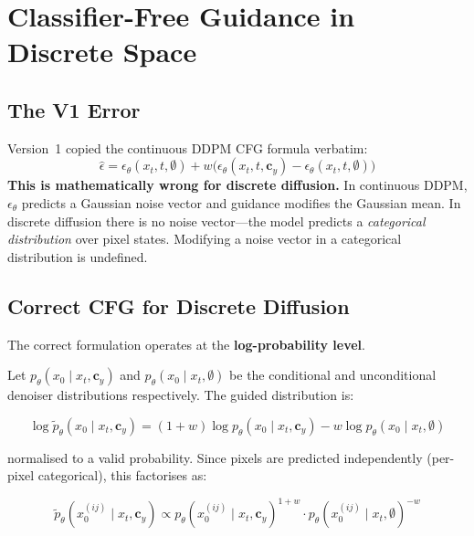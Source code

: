 \documentclass[12pt,a4paper]{article}
\newcommand{\cy}{\mathbf{c}_y}
\newcommand{\WARN}[1]{\begin{tcolorbox}[warnbox, title=V1 Error — Corrected in V2]#1\end{tcolorbox}}
\theoremstyle{definition}
\theoremstyle{plain}
\theoremstyle{remark}
\begin{document}
\section{Classifier-Free Guidance in Discrete Space}
\label{sec:cfg}

\subsection{The V1 Error}

\WARN{
Version~1 copied the continuous DDPM CFG formula verbatim:
\[
  \hat{\epsilon} = \epsilon_\theta(x_t, t, \emptyset)
    + w\bigl(\epsilon_\theta(x_t, t, \cy) - \epsilon_\theta(x_t, t, \emptyset)\bigr)
\]
\textbf{This is mathematically wrong for discrete diffusion.}
In continuous DDPM, $\epsilon_\theta$ predicts a Gaussian noise vector and guidance
modifies the Gaussian mean.
In discrete diffusion there is no noise vector—the model predicts a
\emph{categorical distribution} over pixel states.
Modifying a noise vector in a categorical distribution is undefined.
}

\subsection{Correct CFG for Discrete Diffusion}

The correct formulation operates at the \textbf{log-probability level}.

Let $p_\theta(x_0 \mid x_t, \cy)$ and $p_\theta(x_0 \mid x_t, \emptyset)$ be the
conditional and unconditional denoiser distributions respectively.
The guided distribution is:

\begin{equation}
  \log \tilde{p}_\theta(x_0 \mid x_t, \cy)
  = (1 + w)\log p_\theta(x_0 \mid x_t, \cy)
  - w\log p_\theta(x_0 \mid x_t, \emptyset)
  \label{eq:disc_cfg}
\end{equation}

normalised to a valid probability.
Since pixels are predicted independently (per-pixel categorical), this factorises as:

\begin{equation}
  \tilde{p}_\theta(x_0^{(ij)} \mid x_t, \cy)
  \propto
  p_\theta(x_0^{(ij)} \mid x_t, \cy)^{1+w}
  \cdot
  p_\theta(x_0^{(ij)} \mid x_t, \emptyset)^{-w}
  \label{eq:disc_cfg_factored}
\end{equation}
\end{document}

